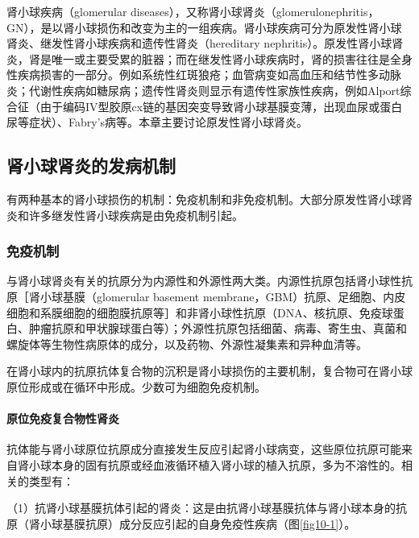 肾小球疾病（glomerular
diseases），又称肾小球肾炎（glomerulonephritis，GN），是以肾小球损伤和改变为主的一组疾病。肾小球疾病可分为原发性肾小球肾炎、继发性肾小球疾病和遗传性肾炎（hereditary
nephritis）。原发性肾小球肾炎，肾是唯一或主要受累的脏器；而在继发性肾小球疾病时，肾的损害往往是全身性疾病损害的一部分。例如系统性红斑狼疮；血管病变如高血压和结节性多动脉炎；代谢性疾病如糖尿病；遗传性肾炎则显示有遗传性家族性疾病，例如Alport综合征（由于编码IV型胶原cx链的基因突变导致肾小球基膜变薄，出现血尿或蛋白尿等症状）、Fabry's病等。本章主要讨论原发性肾小球肾炎。

\subsection{肾小球肾炎的发病机制}

有两种基本的肾小球损伤的机制：免疫机制和非免疫机制。大部分原发性肾小球肾炎和许多继发性肾小球疾病是由免疫机制引起。

\subsubsection{免疫机制}

与肾小球肾炎有关的抗原分为内源性和外源性两大类。内源性抗原包括肾小球性抗原［肾小球基膜（glomerular
basement
membrane，GBM）抗原、足细胞、内皮细胞和系膜细胞的细胞膜抗原等］和非肾小球性抗原（DNA、核抗原、免疫球蛋白、肿瘤抗原和甲状腺球蛋白等）；外源性抗原包括细菌、病毒、寄生虫、真菌和螺旋体等生物性病原体的成分，以及药物、外源性凝集素和异种血清等。

在肾小球内的抗原抗体复合物的沉积是肾小球损伤的主要机制，复合物可在肾小球原位形成或在循环中形成。少数可为细胞免疫机制。

\paragraph{原位免疫复合物性肾炎}
抗体能与肾小球原位抗原成分直接发生反应引起肾小球病变，这些原位抗原可能来自肾小球本身的固有抗原或经血液循环植入肾小球的植入抗原，多为不溶性的。相关的类型有：

（1）抗肾小球基膜抗体引起的肾炎：这是由抗肾小球基膜抗体与肾小球本身的抗原（肾小球基膜抗原）成分反应引起的自身免疫性疾病（图\ref{fig10-1}）。

